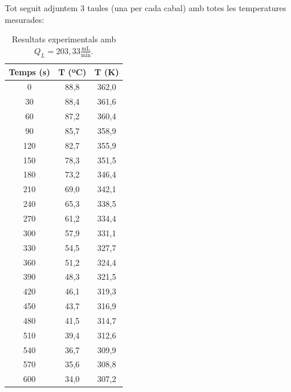 \documentclass[10pt, twoside]{article}
\begin{document}
Tot seguit adjuntem 3 taules (una per cada cabal) amb totes les temperatures mesurades:
\begin{table}[H]
    \centering
    \begin{minipage}{0.3\textwidth}
        \centering
        \caption{Resultats experimentals amb $Q_L = 203,33 \frac{\text{mL}}{\text{min}}$.}
        \begin{tabular}{ccc}
            \toprule
            \textbf{Temps (s)} & \textbf{T (ºC)} & \textbf{T (K)} \\
            \midrule
            0   & 88,8 & 362,0 \\
            30  & 88,4 & 361,6 \\
            60  & 87,2 & 360,4 \\
            90  & 85,7 & 358,9 \\
            120 & 82,7 & 355,9 \\
            150 & 78,3 & 351,5 \\
            180 & 73,2 & 346,4 \\
            210 & 69,0 & 342,1 \\
            240 & 65,3 & 338,5 \\
            270 & 61,2 & 334,4 \\
            300 & 57,9 & 331,1 \\
            330 & 54,5 & 327,7 \\
            360 & 51,2 & 324,4 \\
            390 & 48,3 & 321,5 \\
            420 & 46,1 & 319,3 \\
            450 & 43,7 & 316,9 \\
            480 & 41,5 & 314,7 \\
            510 & 39,4 & 312,6 \\
            540 & 36,7 & 309,9 \\
            570 & 35,6 & 308,8 \\
            600 & 34,0 & 307,2 \\
            
            \bottomrule
        \end{tabular}
        

\end{minipage}
\end{table}
\end{document}
